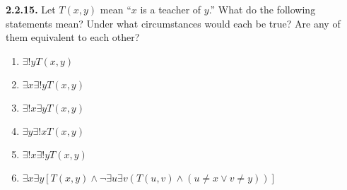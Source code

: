 \documentclass[12pt]{amsart}
\newenvironment{statement}[1]{\smallskip\noindent\color[rgb]{.6627, .3529, .6314} {\bf #1.}}{}
\theoremstyle{definition}
\theoremstyle{remark}
\begin{document}
\begin{statement}{2.2.15}
Let $T(x, y)$ mean ``$x$ is a teacher of $y$.''
What do the following statements mean?
Under what circumstances would each be true?
Are any of them equivalent to each other?
\begin{enumerate}
	\item $\exists! y T(x, y)$
	
	\item $\exists x \exists! y T(x, y)$
	
	\item $\exists! x \exists y T(x, y)$
	
	\item $\exists y \exists! x T(x, y)$
	
	\item $\exists! x \exists! y T(x, y)$
	
	\item $\exists x \exists y [T(x, y) \wedge \neg \exists u \exists v (T(u, v) \wedge (u \neq x \vee v \neq y))]$
\end{enumerate}
\end{statement}
\end{document}

